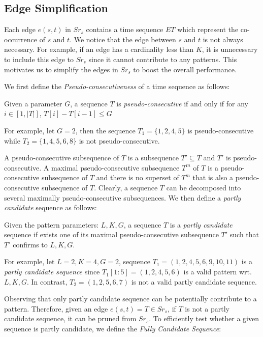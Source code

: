 \subsection{Edge Simplification}
Each edge $e(s,t)$ in $Sr_s$ contains a time sequence $ET$ 
which represent the co-occurrence of $s$ and $t$. We notice that the edge between $s$ and $t$ is not always necessary. For example, if an edge has a
cardinality less than $K$, it is unnecessary to include this edge to $Sr_s$ since it cannot contribute to any patterns.
This motivates us to simplify the edges in $Sr_s$ to boost the overall performance.

We first define the \emph{Pseudo-consecutiveness} of a time sequence as follows:
\begin{definition}
Given a parameter $G$, a sequence $T$ is \emph{pseudo-consecutive} if and only
if for any $i\in [1, |T|]$, $T[i] - T[i-1] \leq G$
\end{definition}
For example, let $G = 2$, then the sequence $T_1=\{1, 2, 4, 5\}$ is pseudo-consecutive
while $T_2=\{1,4,5,6,8\}$ is not pseudo-consecutive. 

A pseudo-consecutive subsequence of $T$ is a subsequence $T' \subseteq T$
and $T'$ is pseudo-consecutive. A maximal pseudo-consecutive subsequence 
$T^m$ of $T$ is a pseudo-consecutive subsequence of $T$ and there is 
no superset of $T^m$ that is also a pseudo-consecutive subsequence of $T$.
Clearly, a sequence $T$ can be decomposed into several maximally pseudo-consecutive 
subsequences. We then define a \emph{partly candidate} sequence as follows:

\begin{definition}
Given the pattern parameters: $L,K,G$, a sequence $T$ is 
a \emph{partly candidate} sequence if exists one of its maximal pseudo-consecutive
subsequence $T'$ such that $T'$ confirms to $L,K,G$.
\end{definition}

For example, let $L = 2, K = 4, G = 2$, sequence $T_1=(1,2,4,5,6,9,10,11)$ 
is a \emph{partly candidate sequence} since $T_1[1:5] = (1,2,4,5,6)$ is a valid
pattern wrt. $L,K,G$. In contrast, $T_2=(1,2,5,6,7)$ is not a valid partly candidate sequence.

Observing that only partly candidate sequence can be potentially contribute to a 
pattern. Therefore, given an edge $e(s,t)=T \in Sr_s$, if $T$ is not a partly
candidate sequence, it can be pruned from $Sr_s$. To efficiently
test whether a given sequence is partly candidate, we define the \emph{Fully Candidate Sequence}:

